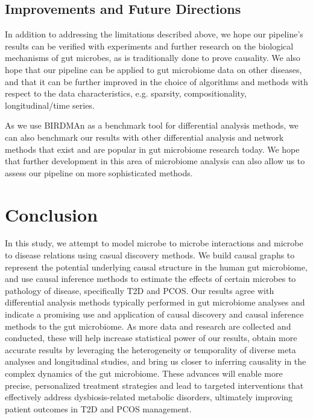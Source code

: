 \documentclass[12pt,letterpaper]{article}
\begin{document}
\subsection{Improvements and Future Directions}

In addition to addressing the limitations described above, we hope our pipeline’s results can be verified with experiments and further research on the biological mechanisms of gut microbes, as is traditionally done to prove causality. We also hope that our pipeline can be applied to gut microbiome data on other diseases, and that it can be further improved in the choice of algorithms and methods with respect to the data characteristics, e.g. sparsity, compositionality, longitudinal/time series. 

As we use BIRDMAn as a benchmark tool for differential analysis methods, we can also benchmark our results with other differential analysis and network methods that exist and are popular in gut microbiome research today. We hope that further development in this area of microbiome analysis can also allow us to assess our pipeline on more sophisticated methods. 

\section{Conclusion}

In this study, we attempt to model microbe to microbe interactions and microbe to disease relations using casual discovery methods. We build causal graphs to represent the potential underlying causal structure in the human gut microbiome, and use causal inference methods to estimate the effects of certain microbes to pathology of disease, specifically T2D and PCOS. Our results agree with differential analysis methods typically performed in gut microbiome analyses and indicate a promising use and application of causal discovery and causal inference methods to the gut microbiome. As more data and research are collected and conducted, these will help increase statistical power of our results, obtain more accurate results by leveraging the heterogeneity or temporality of diverse meta analyses and longitudinal studies, and bring us closer to inferring causality in the complex dynamics of the gut microbiome. These advances will enable more precise, personalized treatment strategies and lead to targeted interventions that effectively address dysbiosis-related metabolic disorders, ultimately improving patient outcomes in T2D and PCOS management. 
\end{document}
